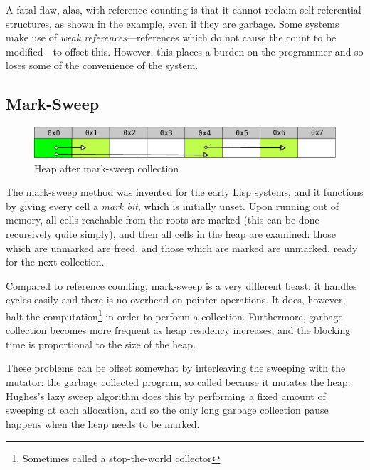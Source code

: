 A fatal flaw, alas, with reference counting is that it cannot reclaim
self-referential structures, as shown in the example, even if they are
garbage\cite{McBeth63}. Some systems make use of \textit{weak
  references}---references which do not cause the count to be
modified---to offset this\cite{Brown95}. However, this places a burden
on the programmer and so loses some of the convenience of the system.

\subsection{Mark-Sweep}
\label{sec:lit-gc-marksweep}

\begin{figure}[h]
  \centering
  \includegraphics[width=\textwidth]{lit-gc-marksweep}
  \caption{Heap after mark-sweep collection}
  \label{fig:lit-gc-marksweep}
\end{figure}

The mark-sweep method was invented for the early Lisp
systems\cite{McCarthy60}, and it functions by giving every cell a
\textit{mark bit}, which is initially unset. Upon running out of
memory, all cells reachable from the roots are marked (this can be
done recursively quite simply), and then all cells in the heap are
examined: those which are unmarked are freed, and those which are
marked are unmarked, ready for the next
collection\cite{GarbageCollection}.

Compared to reference counting, mark-sweep is a very different beast:
it handles cycles easily and there is no overhead on pointer
operations. It does, however, halt the computation\footnote{Sometimes
  called a stop-the-world collector} in order to perform a
collection\cite{GarbageCollection}. Furthermore, garbage collection
becomes more frequent as heap residency increases\cite{McCarthy60},
and the blocking time is proportional to the size of the
heap\cite{Appel87}.

These problems can be offset somewhat by interleaving the sweeping
with the mutator: the garbage collected program, so called because it
mutates the heap\cite{Dijkstra78}. Hughes's lazy sweep
algorithm\cite{Hughes82} does this by performing a fixed amount of
sweeping at each allocation, and so the only long garbage collection
pause happens when the heap needs to be marked.

